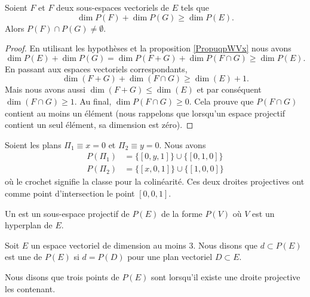 \begin{theorem}[incidence]
    Soient \( F\) et \( F\) deux sous-espaces vectoriels de \( E\) tels que 
    \begin{equation}
        \dim P(F)+\dim P(G)\geq \dim P(E).
    \end{equation}
    Alors \( P(F)\cap P(G)\neq \emptyset\).
\end{theorem}

\begin{proof}
    En utilisant les hypothèses et la proposition \ref{PropuqpWVx} nous avons
    \begin{equation}
        \dim P(E)+\dim P(G)=\dim P(F+G)+\dim P(F\cap G)\geq \dim P(E).
    \end{equation}
    En passant aux espaces vectoriels correspondants,
    \begin{equation}
        \dim(F+G)+\dim(F\cap G)\geq \dim(E)+1.
    \end{equation}
    Mais nous avons aussi \( \dim(F+G)\leq \dim(E)\) et par conséquent \( \dim(F\cap G)\geq 1\). Au final, \( \dim P(F\cap G)\geq 0\). Cela prouve que \( P(F\cap G)\) contient au moins un élément (nous rappelons que lorsqu'un espace projectif contient un seul élément, sa dimension est zéro).
\end{proof}

\begin{example}
    Soient les plans \( \Pi_1\equiv x=0\) et \( \Pi_2\equiv y=0\). Nous avons
    \begin{subequations}
        \begin{align}
            P(\Pi_1)&=\{ [0,y,1] \}\cup\{ [0,1,0] \}\\
            P(\Pi_2)&=\{ [x,0,1] \}\cup\{ [1,0,0] \}
        \end{align}
    \end{subequations}
    où le crochet signifie la classe pour la colinéarité. Ces deux droites projectives ont comme point d'intersection le point \( [0,0,1]\).
\end{example}

\begin{definition}
    Un  est un sous-espace projectif de \( P(E)\) de la forme \( P(V)\) où \( V\) est un hyperplan de \( E\).
\end{definition}

\begin{definition}      \label{DEFooBBMBooSVgTnn}
    Soit \( E\) un espace vectoriel de dimension au moins \( 3\). Nous disons que \( d\subset P(E)\) est une  de \( P(E)\) si \( d=P(D)\) pour une plan vectoriel \( D\subset E\).

    Nous disons que trois points de \( P(E)\) sont  lorsqu'il existe une droite projective les contenant.
\end{definition}


